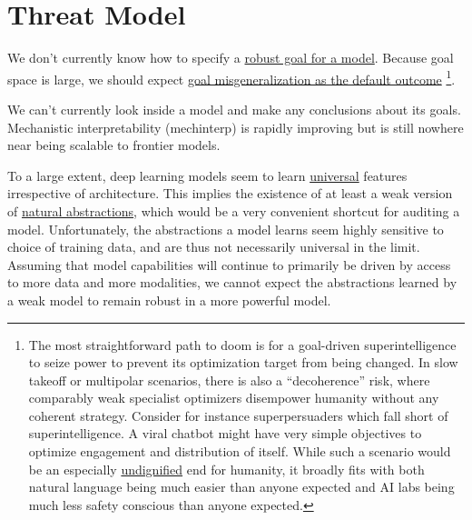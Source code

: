 
\section{Threat Model}

We don't currently know how to specify a \hyperlink{https://arbital.com/p/diamond_maximizer/}{robust goal for a model}.
Because goal space is large, we should expect
\hyperlink{https://www.lesswrong.com/s/r9tYkB2a8Fp4DN8yB/p/FkgsxrGf3QxhfLWHG}{goal misgeneralization as the default outcome}
\footnote{The most straightforward path to doom is for a goal-driven superintelligence to seize power to prevent its optimization target from being changed.
In slow takeoff or multipolar scenarios, there is also a ``decoherence'' risk, 
where comparably weak specialist optimizers disempower humanity without any coherent strategy.
Consider for instance superpersuaders which fall short of superintelligence.
A viral chatbot might have very simple objectives to optimize engagement and distribution of itself.
While such a scenario would be an especially 
\hyperlink{https://www.lesswrong.com/posts/mSF4KTxAGRG3EHmhb/ai-x-risk-approximately-ordered-by-embarrassment}{undignified} 
end for humanity,
it broadly fits with both natural language being much easier than anyone expected and
AI labs being much less safety conscious than anyone expected.}.

We can't currently look inside a model and make any conclusions about its goals.
Mechanistic interpretability (mechinterp) is rapidly improving but is still nowhere near being scalable to frontier models.

To a large extent, deep learning models seem to learn \hyperlink{}{universal} features irrespective of architecture.
This implies the existence of at least a weak version of
\hyperlink{https://www.lesswrong.com/posts/gvzW46Z3BsaZsLc25/natural-abstractions-key-claims-theorems-and-critiques-1}{natural abstractions},
which would be a very convenient shortcut for auditing a model.
Unfortunately, the abstractions a model learns seem highly sensitive to choice of training data, and are thus not necessarily universal in the limit.
Assuming that model capabilities will continue to primarily be driven by access to more data and more modalities, we cannot expect the abstractions learned by a weak model to remain robust in a more powerful model.
